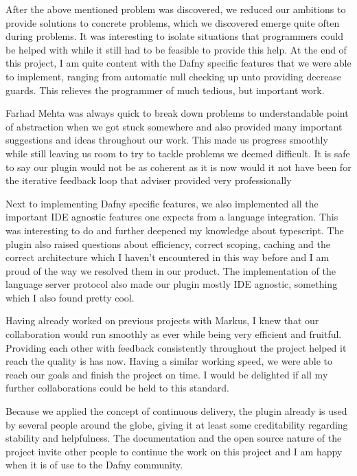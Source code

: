 After the above mentioned problem was discovered, we reduced our ambitions to provide solutions to concrete problems, which we discovered emerge quite often during problems. It was interesting to isolate situations that programmers could be helped with while it still had to be feasible to provide this help. At the end of this project, I am quite content with the Dafny specific features that we were able to implement, ranging from automatic null checking up unto providing decrease guards. This relieves the programmer of much tedious, but important work. \newline

Farhad Mehta was always quick to break down problems to understandable point of abstraction when we got stuck somewhere and also provided many important suggestions and ideas throughout our work. This made us progress smoothly while still leaving us room to try to tackle problems we deemed difficult. It is safe to say our plugin would not be as coherent as it is now would it not have been for the iterative feedback loop that adviser provided very professionally \newline

Next to implementing Dafny specific features, we also implemented all the important IDE agnostic features one expects from a language integration. This was interesting to do and further deepened my knowledge about typescript. The plugin also raised questions about efficiency, correct scoping, caching and the correct architecture which I haven't encountered in this way before and I am proud of the way we resolved them in our product. The implementation of the language server protocol also made our plugin mostly IDE agnostic, something which I also found pretty cool. \newline 

Having already worked on previous projects with Markus, I knew that our collaboration would run smoothly as ever while being very efficient and fruitful. Providing each other with feedback consistently throughout the project helped it reach the quality is has now. Having a similar working speed, we were able to reach our goals and finish the project on time. I would be delighted if all my further collaborations could be held to this standard. \newline

Because we applied the concept of continuous delivery, the plugin already is used by several people around the globe, giving it at least some creditability regarding stability and helpfulness. The documentation and the open source nature of the project invite other people to continue the work on this project and I am happy when it is of use to the Dafny community. 
